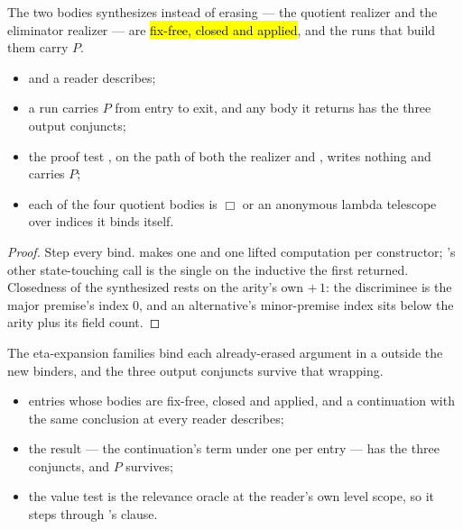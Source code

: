\begin{lemma}
\label{lem:run_recursorRealizer_okW}
\leanok
{}
 The two bodies  synthesizes instead of erasing --- the quotient
realizer and the eliminator realizer --- are \hl{fix-free, closed and applied}, and the runs that build
them carry $P$.
\begin{itemize}
\item {}  and a reader  describes;
\item {} a  run carries $P$ from entry to exit, and any body it returns
has the three output conjuncts;
\item the proof test , on the path of both the realizer and
, writes nothing and carries $P$;
\item each of the four quotient bodies is $\Box$ or an anonymous lambda telescope over indices it binds
itself.
\end{itemize}
\end{lemma}
\begin{proof}
\leanok
{}
 Step every bind.  makes one  and one lifted
 computation per constructor; 's other state-touching call is
the single  on the inductive the first returned. Closedness of the
synthesized  rests on the arity's own $+\,1$: the discriminee is the major premise's index
$0$, and an alternative's minor-premise index sits below the arity plus its field count.
\end{proof}
\begin{lemma}
\label{lem:run_withEtaPrefixLets_okW}
\leanok
{}
 The eta-expansion families bind each already-erased argument in a  outside
the new binders, and the three output conjuncts survive that wrapping.
\begin{itemize}
\item {} entries whose bodies are fix-free, closed and applied, and a continuation with the
same conclusion at every reader  describes;
\item {} the result --- the continuation's term under one  per entry --- has the
three conjuncts, and $P$ survives;
\item the value test is the relevance oracle at the reader's own level scope, so it steps through
's  clause.
\end{itemize}
\end{lemma}
